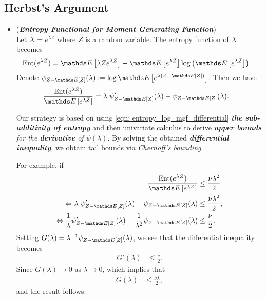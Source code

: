 \documentclass[11pt]{article}
\begin{document}
\subsection{Herbst's Argument}
\begin{itemize}
\item \begin{remark} (\emph{\textbf{Entropy Functional for Moment Generating Function}})\\
Let $X = e^{\lambda Z}$ where $Z$ is a random variable. The entropy function of $X$ becomes
\begin{align*}
\text{Ent}(e^{\lambda Z}) &= \E{}{\lambda Z e^{\lambda Z}} - \E{}{e^{\lambda Z}}\log\paren{\E{}{e^{\lambda Z}}}
\end{align*} Denote $\psi_{Z - \E{}{Z}}(\lambda) := \log\E{}{e^{\lambda (Z - \E{}{Z})}}$. Then we have
\begin{align}
\frac{\text{Ent}(e^{\lambda Z})}{\E{}{e^{\lambda Z}}} &= \lambda\; \psi_{Z - \E{}{Z}}'(\lambda) - \psi_{Z - \E{}{Z}}(\lambda). \label{eqn: entropy_log_mgf_differential}
\end{align} 

Our strategy is based on using \eqref{eqn: entropy_log_mgf_differential} \emph{\textbf{the sub-additivity of entropy}} and then univariate calculus to derive \emph{\textbf{upper bounds} for the \textbf{derivative} of $\psi(\lambda)$}. By solving the obtained \emph{\textbf{differential inequality}}, we obtain tail bounds via \emph{Chernoff's bounding}.

For example, if
\begin{align*}
\frac{\text{Ent}(e^{\lambda Z})}{\E{}{e^{\lambda Z}}} &\le \frac{\nu \lambda^2}{2}  \\
\Leftrightarrow  \lambda\; \psi_{Z - \E{}{Z}}'(\lambda) - \psi_{Z - \E{}{Z}}(\lambda) &\le \frac{\nu \lambda^2}{2},\\
\Leftrightarrow \frac{1}{\lambda}\psi_{Z - \E{}{Z}}'(\lambda) - \frac{1}{\lambda^2}\psi_{Z - \E{}{Z}}(\lambda) &\le \frac{\nu}{2}.
\end{align*}  Setting $G(\lambda) = \lambda^{-1}\psi_{Z - \E{}{Z}}(\lambda)$, we see that the differential inequality becomes
\begin{align*}
G'(\lambda) &\le \frac{\nu}{2}.
\end{align*} Since $G(\lambda) \to 0$ as $\lambda \to 0$, which implies that
\begin{align*}
G(\lambda) &\le \frac{\nu \lambda}{2},
\end{align*} and the result follows. 
\end{remark}


\end{itemize}
\end{document}
